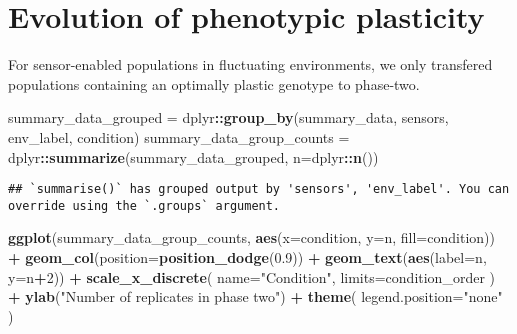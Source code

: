 \documentclass[]{book}
\newenvironment{Shaded}{\begin{snugshade}}{\end{snugshade}}
\newcommand{\DataTypeTok}[1]{\textcolor[rgb]{0.13,0.29,0.53}{#1}}
\newcommand{\DecValTok}[1]{\textcolor[rgb]{0.00,0.00,0.81}{#1}}
\newcommand{\FloatTok}[1]{\textcolor[rgb]{0.00,0.00,0.81}{#1}}
\newcommand{\KeywordTok}[1]{\textcolor[rgb]{0.13,0.29,0.53}{\textbf{#1}}}
\newcommand{\NormalTok}[1]{#1}
\newcommand{\OperatorTok}[1]{\textcolor[rgb]{0.81,0.36,0.00}{\textbf{#1}}}
\newcommand{\StringTok}[1]{\textcolor[rgb]{0.31,0.60,0.02}{#1}}
\begin{document}
\hypertarget{evolution-of-phenotypic-plasticity-1}{%
\section{Evolution of phenotypic plasticity}\label{evolution-of-phenotypic-plasticity-1}}

For sensor-enabled populations in fluctuating environments, we only transfered populations containing an optimally plastic genotype to phase-two.

\begin{Shaded}
\begin{Highlighting}[]
\NormalTok{summary_data_grouped =}\StringTok{ }\NormalTok{dplyr}\OperatorTok{::}\KeywordTok{group_by}\NormalTok{(summary_data, sensors, env_label, condition)}
\NormalTok{summary_data_group_counts =}\StringTok{ }\NormalTok{dplyr}\OperatorTok{::}\KeywordTok{summarize}\NormalTok{(summary_data_grouped, }\DataTypeTok{n=}\NormalTok{dplyr}\OperatorTok{::}\KeywordTok{n}\NormalTok{())}
\end{Highlighting}
\end{Shaded}

\begin{verbatim}
## `summarise()` has grouped output by 'sensors', 'env_label'. You can override using the `.groups` argument.
\end{verbatim}

\begin{Shaded}
\begin{Highlighting}[]
\KeywordTok{ggplot}\NormalTok{(summary_data_group_counts, }\KeywordTok{aes}\NormalTok{(}\DataTypeTok{x=}\NormalTok{condition, }\DataTypeTok{y=}\NormalTok{n, }\DataTypeTok{fill=}\NormalTok{condition)) }\OperatorTok{+}
\StringTok{  }\KeywordTok{geom_col}\NormalTok{(}\DataTypeTok{position=}\KeywordTok{position_dodge}\NormalTok{(}\FloatTok{0.9}\NormalTok{)) }\OperatorTok{+}
\StringTok{  }\KeywordTok{geom_text}\NormalTok{(}\KeywordTok{aes}\NormalTok{(}\DataTypeTok{label=}\NormalTok{n, }\DataTypeTok{y=}\NormalTok{n}\OperatorTok{+}\DecValTok{2}\NormalTok{)) }\OperatorTok{+}
\StringTok{  }\KeywordTok{scale_x_discrete}\NormalTok{(}
    \DataTypeTok{name=}\StringTok{"Condition"}\NormalTok{,}
    \DataTypeTok{limits=}\NormalTok{condition_order}
\NormalTok{  ) }\OperatorTok{+}
\StringTok{  }\KeywordTok{ylab}\NormalTok{(}\StringTok{"Number of replicates in phase two"}\NormalTok{) }\OperatorTok{+}
\StringTok{  }\KeywordTok{theme}\NormalTok{(}
    \DataTypeTok{legend.position=}\StringTok{"none"}
\NormalTok{  )}
\end{Highlighting}
\end{Shaded}
\end{document}
